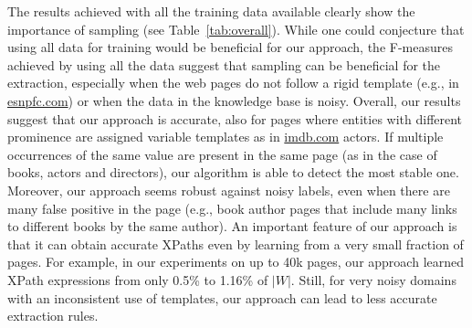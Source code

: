 \documentclass{llncs}
\begin{document}
The results achieved with all the training data available clearly show the importance of sampling (see Table~\ref{tab:overall}). 
While one could conjecture that using all data for training would be beneficial for our approach, the F-measures achieved by using all the data suggest that sampling can be beneficial for the extraction, especially when the web pages do not follow a rigid template (e.g., in \url{esnpfc.com}) or when the data in the knowledge base is noisy. 
Overall, our results suggest that our approach is accurate, also for pages where entities with different prominence are assigned variable templates as in \url{imdb.com} actors. 
If multiple occurrences of the same value are present in the same page (as in the case of books, actors and directors), our algorithm is able to detect the most stable one.
Moreover, our approach seems robust against noisy labels, even when there are many false positive in the page (e.g., book author pages that include many links to different books by the same author).
An important feature of our approach is that it can obtain accurate XPaths even by learning from a very small fraction of pages. 
For example, in our experiments on up to 40k pages, our approach learned XPath expressions from only 0.5\% to 1.16\% of $|W|$.
Still, for very noisy domains with an inconsistent use of templates, our approach can lead to less accurate extraction rules.
\end{document}
